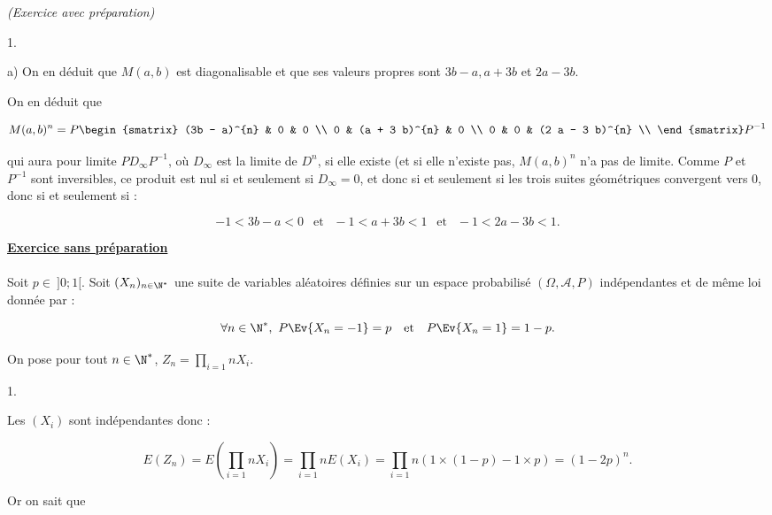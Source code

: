 \documentclass[11pt]{article}%
\begin{document}
\begin{exercice}{\it (Exercice avec préparation)}
\begin{noliste}{1.}
\begin{noliste}{a)}
 On en déduit que $M(a,b)$ est diagonalisable et que ses valeurs
propres sont $3b-a, a + 3b$ et $2a-3b$. \\

 \item On en déduit que 
 
\[
 M( a,b)^{n} = P \begin{smatrix}
(3b - a)^{n} & 0 & 0 \\
0 & (a + 3 b)^{n} & 0 \\
0 & 0 & (2 a - 3 b)^{n} \\
\end{smatrix}
P^{-1} 
\]

 qui aura pour limite $P D_{\infty} P^{-1}$, où $D_{ \infty}$ est la
limite de $D^{n}$, si elle existe (et si elle n'existe pas,
$M(a,b)^{n}$ n'a pas de limite. Comme $P$ et $P^{-1}$ sont inversibles,
ce produit est nul si et seulement si $D_{ \infty } = 0$, et donc si et
seulement si les trois suites géométriques convergent vers 0, donc si
et seulement si : 
 
\[
 -1 < 3 b - a < 0 \ \ \text{ et } \ \ -1 < a + 3 b < 1 \ \ \text{ et }
\ \ -1 < 2a - 3 b < 1. 
\]

 \end{noliste}

 \end{noliste}

 \indent

 \noindent \textbf{\underline{Exercice sans préparation}} \\
\\
 Soit $p \in \ ]0;1[$. Soit $(X_{n})_{ n \in \N^* }$ une suite de
variables aléatoires définies sur un espace probabilisé $(\Omega,
\mathcal{A}, P )$ indépendantes et de même loi donnée par : 
 
\[
 \forall n \in \N^*, \ P \Ev{X_{n} = -1} = p \ \ \text{ et } \ \ P
\Ev{X_{n} = 1} = 1 - p. 
\]

 \noindent On pose pour tout $n \in \N^*$, $Z_{n} = \prod\limits_{i =
1}{n} X_{i}$.
 \begin{noliste}{1.}
 \setlength{\itemsep}{4mm}

 \item Les $(X_{i})$ sont indépendantes donc : 
 
\[
 E ( Z_{n} ) = E \left( \prod\limits_{i = 1}{n} X_{i} \right) =
\prod\limits_{i = 1}{n} E ( X_{i} ) = \prod\limits_{i = 1}{n} \left( 1
\times (1-p) - 1 \times p \right) = ( 1 - 2 p)^{n}. 
\]

 Or on sait que
 

\end{noliste}
\end{exercice}
\end{document}
